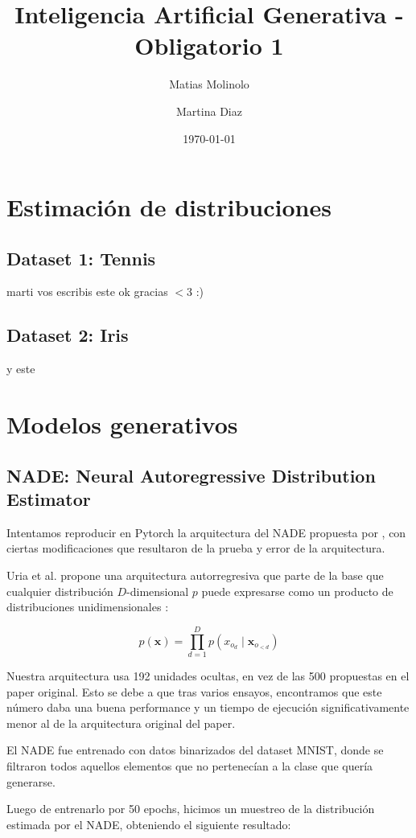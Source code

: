 \documentclass[11pt]{article}
\title{Inteligencia Artificial Generativa - Obligatorio 1}
\author{Matias Molinolo \and Martina Diaz}
\date{\today}
\begin{document}
\maketitle
\thispagestyle{empty}
\newpage
\tableofcontents
\newpage

\section{Estimación de distribuciones}

\subsection{Dataset 1: Tennis}
marti vos escribis este 
ok gracias $<$3
:)
\subsection{Dataset 2: Iris}
y este

\section{Modelos generativos}
\subsection{NADE: Neural Autoregressive Distribution Estimator}

Intentamos reproducir en Pytorch la arquitectura del NADE propuesta por \cite{nade}, con ciertas modificaciones que resultaron de la prueba y error de la arquitectura.

Uria et al. propone una arquitectura autorregresiva que parte de la base que cualquier distribución $D$-dimensional $p$ puede expresarse como un producto de distribuciones unidimensionales \cite{nade}:

$$
p(\boldsymbol{x}) = \prod_{d=1}^{D}p(x_{o_d} \mid \boldsymbol{x}_{o_{<d}})
$$

Nuestra arquitectura usa 192 unidades ocultas, en vez de las 500 propuestas en el paper original. Esto se debe a que tras varios ensayos, encontramos que este número daba una buena performance y un tiempo de ejecución significativamente menor al de la arquitectura original del paper. 

El NADE fue entrenado con datos binarizados del dataset MNIST, donde se filtraron todos aquellos elementos que no pertenecían a la clase que quería generarse.

Luego de entrenarlo por 50 epochs, hicimos un muestreo de la distribución estimada por el NADE, obteniendo el siguiente resultado:
\end{document}
